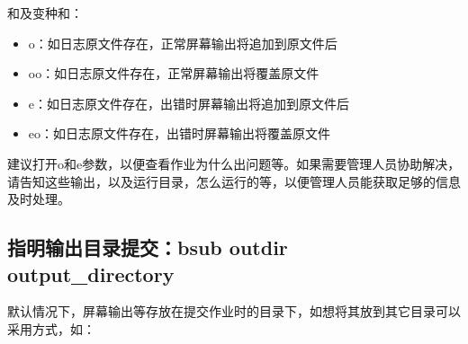 \documentclass[a4paper,12pt,english]{sphinxmanual}
\begin{document}
\sphinxAtStartPar
{}

\sphinxAtStartPar
{}和及变种和：
\begin{itemize}
\item {} 
\sphinxAtStartPar
\sphinxhyphen{}o：如日志原文件存在，正常屏幕输出将追加到原文件后

\item {} 
\sphinxAtStartPar
\sphinxhyphen{}oo：如日志原文件存在，正常屏幕输出将覆盖原文件

\item {} 
\sphinxAtStartPar
\sphinxhyphen{}e：如日志原文件存在，出错时屏幕输出将追加到原文件后

\item {} 
\sphinxAtStartPar
\sphinxhyphen{}eo：如日志原文件存在，出错时屏幕输出将覆盖原文件

\end{itemize}

\sphinxAtStartPar
建议打开\sphinxhyphen{}o和\sphinxhyphen{}e参数，以便查看作业为什么出问题等。如果需要管理人员协助解决，请告知这些输出，以及运行目录，怎么运行的等，以便管理人员能获取足够的信息及时处理。


\subsection{指明输出目录提交：bsub \sphinxhyphen{}outdir output\_directory}
\label{\detokenize{lsf/lsf:bsub-outdir-output-directory}}
\sphinxAtStartPar
默认情况下，屏幕输出等存放在提交作业时的目录下，如想将其放到其它目录可以采用方式，如：

\sphinxAtStartPar
{}
\end{document}
